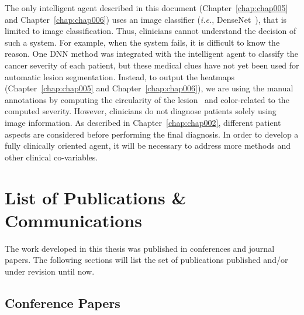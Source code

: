 The only intelligent agent described in this document (Chapter~\ref{chap:chap005} and Chapter~\ref{chap:chap006}) uses an image classifier ({\it i.e.}, DenseNet~\cite{Huang_2017_CVPR}), that is limited to image classification.
Thus, clinicians cannot understand the decision of such a system.
For example, when the system fails, it is difficult to know the reason.
One \ac{DNN} method was integrated with the intelligent agent to classify the cancer severity of each patient, but these medical clues have not yet been used for automatic lesion segmentation.
Instead, to output the heatmaps (Chapter~\ref{chap:chap005} and Chapter~\ref{chap:chap006}), we are using the manual annotations by computing the circularity of the lesion~\cite{DALILA2017749} and color-related to the computed severity.
However, clinicians do not diagnose patients solely using image information.
As described in Chapter~\ref{chap:chap002}, different patient aspects are considered before performing the final diagnosis.
In order to develop a fully clinically oriented agent, it will be necessary to address more methods and other clinical co-variables.

\section{List of Publications \& Communications}
\label{sec:chap001006}

The work developed in this thesis was published in conferences and journal papers. The following sections will list the set of publications published and/or under revision until now.

\clearpage

\subsection{Conference Papers}
\label{sec:chap00100601}

